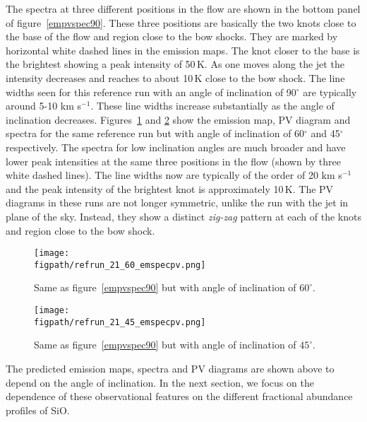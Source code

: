 \documentclass[useAMS,usenatbib,letters]{mn2e}
\newcommand{\figpath}{PFIGS/}
\begin{document}
The spectra at three different positions in the flow are shown in the
bottom panel of figure~\ref{empvspec90}. These three positions are
basically the two knots close to the base of the flow and region close
to the bow shocks. They are marked by horizontal white dashed lines in
the emission maps. The knot closer to the base is the brightest
showing a peak intensity of 50\,K. As one moves along the jet the
intensity decreases and reaches to about 10\,K close to the bow shock.
The line widths seen for this reference run with an angle of
inclination of 90$^{\circ}$ are typically around 5-10 km s$^{-1}$.
These line widths increase substantially as the angle of inclination
decreases. Figures~\ref{empvspec60} and \ref{empvspec45} show the
emission map, PV diagram and spectra for the same reference run but
with angle of inclination of 60$^{\circ}$ and 45$^{\circ}$
respectively. The spectra for low inclination angles are much broader
and have lower peak intensities at the same three positions in the flow (shown by
three white dashed lines). The line 
widths now are typically of the order of 20 km s$^{-1}$ and the peak
intensity of the brightest knot is approximately 10\,K. 
The PV diagrams in these runs are not longer symmetric, unlike the run
with the jet in plane of the sky. Instead, they show a distinct {\it zig-zag}
pattern at each of the knots and region close to the bow shock.


\begin{figure}
 \texttt{[image: \\figpath/refrun\_21\_60\_emspecpv.png]}
 \caption{Same as figure~\ref{empvspec90} but with angle of
   inclination of $60^{\circ}$.} 
\label{empvspec60}
\end{figure}

\begin{figure}
 \texttt{[image: \\figpath/refrun\_21\_45\_emspecpv.png]}
 \caption{Same as figure~\ref{empvspec90} but with angle of
   inclination of $45^{\circ}$.} 
\label{empvspec45}
\end{figure}

%
The predicted emission maps, spectra and PV diagrams are shown above to depend
on the angle of inclination. In the next section, we focus on the
dependence of these observational features on the 
different fractional abundance profiles of SiO.
\end{document}
